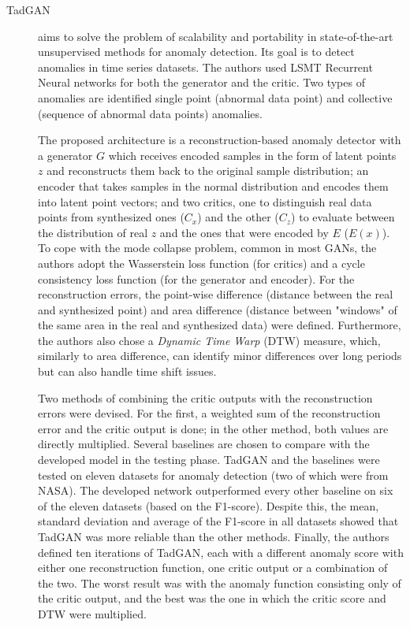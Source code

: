 \begin{description}
    \item[TadGAN \cite{geiger.etal_TadGANTimeSeries_2020}] aims to solve the problem of scalability and portability in state-of-the-art unsupervised methods for anomaly detection. Its goal is to detect anomalies in time series datasets. The authors used LSMT Recurrent Neural networks for both the generator and the critic. Two types of anomalies are identified single point (abnormal data point) and collective (sequence of abnormal data points) anomalies. 
    
    The proposed architecture is a reconstruction-based anomaly detector with a generator $G$ which receives encoded samples in the form of latent points $z$ and reconstructs them back to the original sample distribution; an encoder that takes samples in the normal distribution and encodes them into latent point vectors; and two critics, one to distinguish real data points from synthesized ones ($C_x$) and the other ($C_z$) to evaluate between the distribution of real $z$ and the ones that were encoded by $E$ ($E(x)$). To cope with the mode collapse problem, common in most GANs, the authors adopt the Wasserstein loss function (for critics) and a cycle consistency loss function (for the generator and encoder). For the reconstruction errors, the point-wise difference (distance between the real and synthesized point)  and area difference (distance between "windows" of the same area in the real and synthesized data) were defined. Furthermore, the authors also chose a \textit{Dynamic Time Warp} (DTW) measure, which, similarly to area difference, can identify minor differences over long periods but can also handle time shift issues. 
    
    Two methods of combining the critic outputs with the reconstruction errors were devised. For the first, a weighted sum of the reconstruction error and the critic output is done; in the other method, both values are directly multiplied. Several baselines are chosen to compare with the developed model in the testing phase. TadGAN and the baselines were tested on eleven datasets for anomaly detection (two of which were from NASA). The developed network outperformed every other baseline on six of the eleven datasets (based on the F1-score). Despite this, the mean, standard deviation and average of the F1-score in all datasets showed that TadGAN was more reliable than the other methods. Finally, the authors defined ten iterations of TadGAN, each with a different anomaly score with either one reconstruction function, one critic output or a combination of the two. The worst result was with the anomaly function consisting only of the critic output, and the best was the one in which the critic score and DTW were multiplied.
\end{description}

